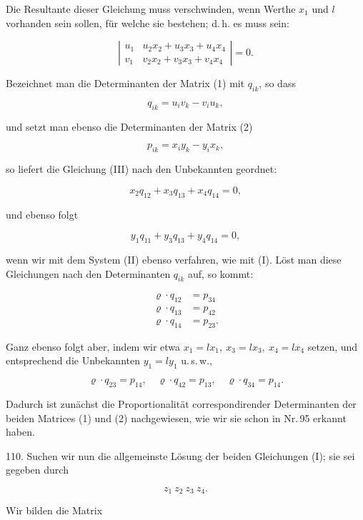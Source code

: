 \documentclass[11pt]{article}
\providecommand{\weberpage}[1]{}
\providecommand{\weq}[2]{\begin{equation}\tag{#1}#2\end{equation}}
\begin{document}
Die Resultante dieser Gleichung muss verschwinden, wenn Werthe $x_1$ und $l$ vorhanden sein sollen, für welche sie bestehen; d.\,h. es muss sein:

\weq{III}{\left| \begin{array}{cc} u_1 & u_2x_2+u_3x_3+u_4x_4 \\ v_1 & v_2x_2+v_3x_3+v_4x_4 \end{array} \right| = 0.}

Bezeichnet man die Determinanten der Matrix (1) mit $q_{ik}$, so dass

\[ q_{ik} = u_iv_k - v_iu_k, \]

und setzt man ebenso die Determinanten der Matrix (2)

\[ p_{ik} = x_iy_k - y_ix_k, \]

so liefert die Gleichung (III) nach den Unbekannten geordnet:

\weq{IIIa}{x_2q_{12}+x_3q_{13}+x_4q_{14}=0,}

und ebenso folgt

\[ y_1q_{11}+y_3q_{13}+y_4q_{14}=0, \] %

wenn wir mit dem System (II) ebenso verfahren, wie mit (I). Löst man diese Gleichungen nach den Determinanten $q_{ik}$ auf, so kommt:

\[ \begin{aligned} \varrho\cdot q_{12} &= p_{34}\\ \varrho\cdot q_{13} &= p_{42}\\ \varrho\cdot q_{14} &= p_{23}. \end{aligned} \]


\weberpage{116}

Ganz ebenso folgt aber, indem wir etwa $x_1=lx_1,\ x_3=lx_3,\ x_4=lx_4$ setzen, und entsprechend die Unbekannten $y_1=ly_1$ u.\,s.\,w.,

\[ \varrho\cdot q_{23}=p_{14},\quad \varrho\cdot q_{42}=p_{13},\quad \varrho\cdot q_{34}=p_{14}. \]

Dadurch ist zunächst die Proportionalität correspondirender Determinanten der beiden Matrices (1) und (2) nachgewiesen, wie wir sie schon in Nr.\,95 erkannt haben.

110. Suchen wir nun die allgemeinste Lösung der beiden Gleichungen (I); sie sei gegeben durch

\[ z_1\ z_2\ z_3\ z_4. \]

Wir bilden die Matrix
\end{document}

